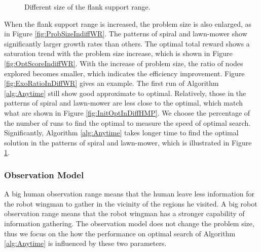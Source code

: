 \documentclass[12pt]{article}
\begin{document}
\begin{figure}[H]
  \caption{Different size of the flank support range.} 
  \label{fig:PMdiffWR2} %
\end{figure}

When the flank support range is increased, the problem size is also enlarged, as in Figure \ref{fig:ProbSizeIndiffWR}.
The patterns of spiral and lawn-mower show significantly larger growth rates than others. 
The optimal total reward shows a saturation trend with the problem size increase, which is shown in Figure \ref{fig:OptScoreIndiffWR}.
With the increase of problem size, the ratio of nodes explored becomes smaller, which indicates the efficiency improvement.
Figure \ref{fig:ExoRatioInDiffWR} gives an example.
The first run of Algorithm \ref{alg:Anytime} still show good approximate to optimal. 
Relatively, those in the patterns of spiral and lawn-mower are less close to the optimal, which match what are shown in Figure \ref{fig:InitOptInDiffHMP}.
We choose the percentage of the number of runs to find the optimal to measure the speed of optimal search.
Significantly, Algorithm \ref{alg:Anytime} takes longer time to find the optimal solution in the patterns of spiral and lawn-mower, which is illustrated in Figure \ref{fig:PMdiffWR2}.

\subsubsection{Observation Model}
\label{subsubsec:observation_model}

A big human observation range means that the human leave less information for the robot wingman to gather in the vicinity of the regions he visited.
A big robot observation range means that the robot wingman has a stronger capability of information gathering.
The observation model does not change the problem size, thus we focus on the how the performance on optimal search of Algorithm \ref{alg:Anytime} is influenced by these two parameters.
\end{document}
